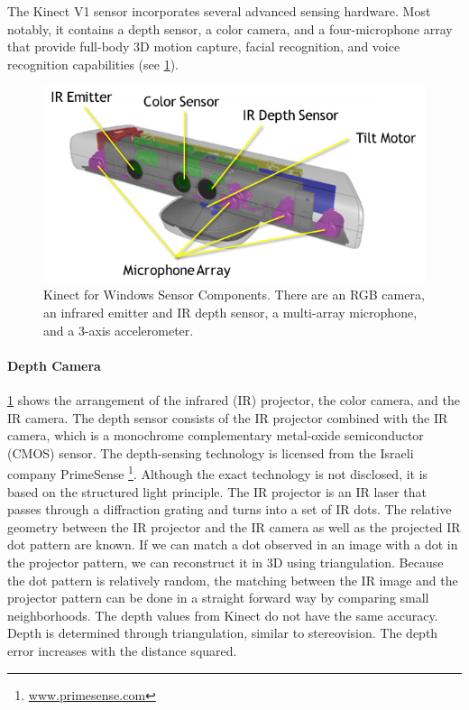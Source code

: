 The Kinect V1 sensor incorporates several advanced sensing hardware. Most notably, it contains a depth sensor, a color camera, and a four-microphone array that provide full-body 3D motion capture, facial recognition, and voice recognition capabilities (see \figurename{\ref{fig:2-bg:kinect}}). 
\begin{figure}
\centering
\includegraphics[width=0.7\linewidth]{figures/2-bg/kinect}
\caption{Kinect for Windows Sensor Components. There are an RGB camera, an infrared emitter and IR depth sensor, a multi-array microphone, and a 3-axis accelerometer.}
\label{fig:2-bg:kinect}
\end{figure}

\paragraph{Depth Camera}
\figurename{\ref{fig:2-bg:kinect}} shows the arrangement of the infrared (IR) projector, the color camera, and the IR camera. The depth sensor consists of the IR projector combined with the IR camera, which is a monochrome complementary metal-oxide semiconductor (CMOS) sensor. The depth-sensing technology is licensed from the Israeli company PrimeSense \footnote{\url{www.primesense.com}}. Although the exact technology is not disclosed, it is based on the structured light principle. The IR projector is an IR laser that passes through a diffraction grating and turns into a set of IR dots. The relative geometry between the IR projector and the IR camera as well as the projected IR dot pattern are known. If we can match a dot observed in an image with a dot in the projector pattern, we can reconstruct it in 3D using triangulation. Because the dot pattern is relatively random, the matching between the IR image and the projector pattern can be done in a straight forward way by comparing small neighborhoods. The depth values from Kinect do not have the same accuracy. Depth is determined through triangulation, similar to stereovision. The depth error increases with the distance squared.

